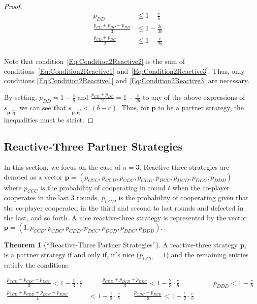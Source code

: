 \documentclass{article}
\theoremstyle{definition}
\newtheorem{theorem}{Theorem}[section]
\begin{document}
\begin{proof}
\begin{align} 
  p_{DD} & \leq 1 - \frac{c}{b} \\ \label{Eq:Condition2Reactive1}
  \frac{p_{CD} + p_{DC} + p_{DD}}{3} & \leq 1 - \frac{2c}{3b} \\ \label{Eq:Condition2Reactive2}
  \frac{p_{CD} + p_{DC}}{2} & \leq 1 - \frac{c}{2b} \\ \label{Eq:Condition2Reactive3}
\end{align}

Note that condition~\eqref{Eq:Condition2Reactive2} is the sum of
conditions~\eqref{Eq:Condition2Reactive1} and~\eqref{Eq:Condition2Reactive3}.
Thus, only conditions \eqref{Eq:Condition2Reactive1} and
\eqref{Eq:Condition2Reactive3} are necessary.

By setting, $p_{DD} = 1 - \frac{c}{b}$ and $\frac{p_{CD} + p_{DC}}{2} = 1 -
\frac{c}{2b}$ to any of the above expressions of $s_{\mathbf{\mathbf{p},
\tilde{q}}^{i}}$ we can see that $s_{\mathbf{\mathbf{p}, \tilde{q}}^{i}} < (b -
c)$. Thus, for $\mathbf{p}$ to be a partner strategy, the inequalities must be
strict.

\end{proof}

\subsection{Reactive-Three Partner Strategies}

In this section, we focus on the case of $n=3$. Reactive-three strategies are
denoted as a vector $\mathbf{p}=(p_{CCC}, p_{CCD}, p_{CDC}, p_{CDD}, p_{DCC},
p_{DCD}, p_{DDC}, p_{DDD})$ where $p_{CCC}$ is the probability of cooperating in
round $t$ when the co-player cooperates in the last 3 rounds, $p_{CCD}$ is the
probability of cooperating given that the co-player cooperated in the third and
second to last rounds and defected in the last, and so forth. A nice
reactive-three strategy is represented by the vector $\mathbf{p}=(1, p_{CCD},
p_{CDC}, p_{CDD}, p_{DCC}, p_{DCD}, p_{DDC}, p_{DDD})$.

\begin{theorem}[``Reactive-Three Partner Strategies'']\label{theorem:reactive_three_partner_strategies}
A reactive-three strategy $\mathbf{p}$, is a partner strategy if and only if,
it's nice ($p_{CCC} = 1$) and the remaining entries satisfy the conditions:

\begin{align}\label{eq:three_bit_conditions}
  \frac{p_{CCD} + p_{CDC} + p_{DCC}}{3} < 1\!-\! \frac{1}{3} \cdot \frac{c}{b} & \qquad 
  \frac{p_{CDD} + p_{DCD} + p_{DDC}}{3} < 1\!-\! \frac{2}{3} \cdot \frac{c}{b} & \qquad 
  p_{DDD} < 1\!-\! \frac{c}{b} \\
  \frac{p_{CCD} + p_{CDD} + p_{DCC} + p_{DDC}}{4}  & < 1\!-\! \frac{1}{2} \cdot \frac{c}{b} 
  \qquad \frac{p_{CDC} + p_{DCD}}{2} < 1\!-\! \frac{1}{2} \cdot \frac{c}{b}
\end{align}
\end{theorem}
\end{document}

